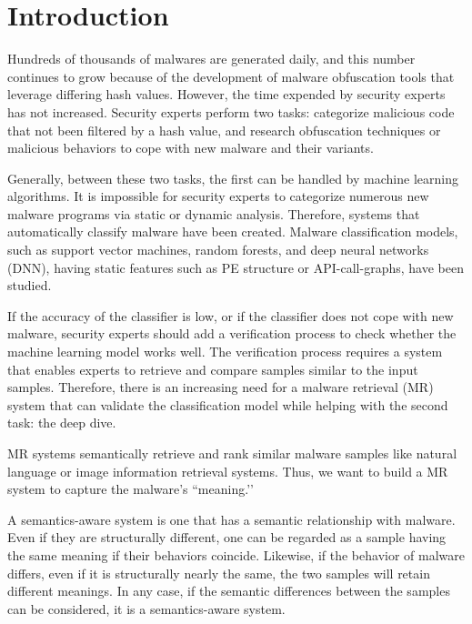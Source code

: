 \section{Introduction}

Hundreds of thousands of malwares are generated daily, and this number continues to grow because of the development of malware obfuscation tools that leverage differing hash values. However, the time expended by security experts has not increased. Security experts perform two tasks: categorize malicious code that not been filtered by a hash value, and research obfuscation techniques or malicious behaviors to cope with new malware and their variants.

Generally, between these two tasks, the first can be handled by machine learning algorithms. It is impossible for security experts to categorize numerous new malware programs via static or dynamic analysis. Therefore, systems that automatically classify malware have been created. Malware classification models, such as support vector machines, random forests, and deep neural networks (DNN), having static features such as PE structure or API-call-graphs, have been studied\cite{chen2012malware, park2010fast, bai2014malware, yuan2014droid, saxe2015deep}.

If the accuracy of the classifier is low, or if the classifier does not cope with new malware, security experts should add a verification process to check whether the machine learning model works well. The verification process requires a system that enables experts to retrieve and compare samples similar to the input samples. Therefore, there is an increasing need for a malware retrieval (MR) system that can validate the classification model while helping with the second task: the deep dive.

MR systems semantically retrieve and rank similar malware samples like natural language or image information retrieval systems. Thus, we want to build a MR system to capture the malware’s ``meaning.’’

A semantics-aware system is one that has a semantic relationship with malware. Even if they are structurally different, one can be regarded as a sample having the same meaning if their behaviors coincide. Likewise, if the behavior of malware differs, even if it is structurally nearly the same, the two samples will retain different meanings. In any case, if the semantic differences between the samples can be considered, it is a semantics-aware system.
 
